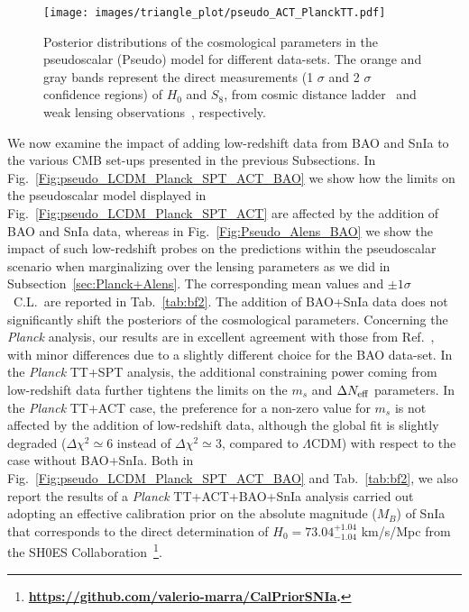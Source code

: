 \documentclass[a4paper,11pt]{article}
\begin{document}
 \begin{figure}[h!]
 \centering
   \texttt{[image: images/triangle\_plot/pseudo\_ACT\_PlanckTT.pdf]}  
  \caption{Posterior distributions of the cosmological parameters in the pseudoscalar (Pseudo) model for different data-sets. The orange and gray bands represent the direct measurements (1 $\sigma$ and 2 $\sigma$ confidence regions) of $H_0$ and $S_8$, from cosmic distance ladder~\cite{Riess:2020fzl} and weak lensing observations~\cite{Gatti:2021uwl}, respectively.}
  \label{Fig:act_new}
\end{figure}


We now examine the impact of adding low-redshift data from BAO and SnIa to the various CMB set-ups presented in the previous Subsections. In Fig.~\ref{Fig:pseudo_LCDM_Planck_SPT_ACT_BAO} we show how the limits on the pseudoscalar model displayed in Fig.~\ref{Fig:pseudo_LCDM_Planck_SPT_ACT} are affected by the addition of BAO and SnIa data, whereas in Fig.~\ref{Fig:Pseudo_Alens_BAO} we show the impact of such low-redshift probes on the predictions within the pseudoscalar scenario when marginalizing over the lensing parameters as we did in Subsection~\ref{sec:Planck+Alens}. The corresponding mean values and $\pm 1 \sigma$~C.L.\ are reported in Tab.~\ref{tab:bf2}.
The addition of BAO+SnIa data does not significantly shift the posteriors of the cosmological parameters. Concerning the \textit{Planck} analysis, our results are in {excellent} agreement with those from Ref.~\cite{Archidiacono:2020yey}, with minor differences due to a slightly different choice for the BAO data-set. In the \textit{Planck} TT+SPT analysis, the additional constraining power coming from low-redshift data further tightens the limits on the $m_s$ and $\Delta N_{\rm eff}$ parameters.
In the \textit{Planck} TT+ACT case, the preference for a non-zero value for $m_s$ is not affected by the addition of low-redshift data, although the global fit is slightly degraded ($\Delta\chi^2\simeq6$ instead of $\Delta\chi^2\simeq3$, compared to $\Lambda$CDM) with respect to the case  without BAO+SnIa.
Both in Fig.~\ref{Fig:pseudo_LCDM_Planck_SPT_ACT_BAO} and Tab.~\ref{tab:bf2}, we also report the results of a \textit{Planck} TT+ACT+BAO+SnIa analysis carried out adopting an effective calibration prior on the absolute magnitude ($M_B$) of SnIa~\cite{Camarena:2019moy,Camarena:2021jlr} that corresponds to the direct determination of $H_0=73.04^{+1.04}_{-1.04}$ km/s/Mpc from the SH0ES Collaboration~\cite{Riess:2021jrx}\footnote{\textbf{ \url{https://github.com/valerio-marra/CalPriorSNIa}.}}. 
\end{document}
